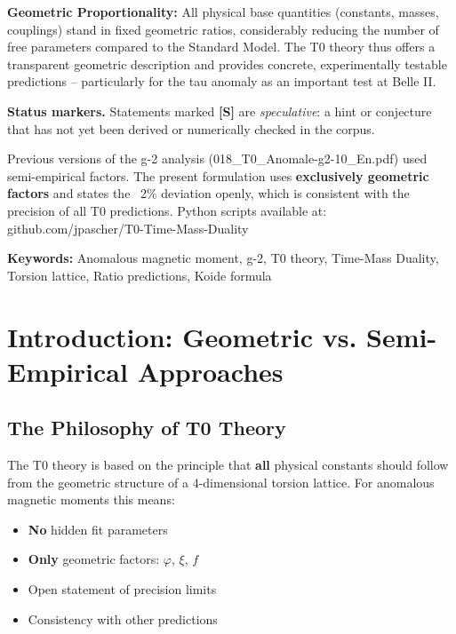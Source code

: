 		\textbf{Geometric Proportionality:} All physical base quantities (constants, masses, couplings) stand in fixed geometric ratios, considerably reducing the number of free parameters compared to the Standard Model. The T0 theory thus offers a transparent geometric description and provides concrete, experimentally testable predictions – particularly for the tau anomaly as an important test at Belle II.

	\medskip\noindent\textbf{Status markers.} Statements marked \textbf{[S]} are \emph{speculative}: a hint or conjecture that has not yet been derived or numerically checked in the corpus.


	
	\begin{tcolorbox}[colback=yellow!10!white, colframe=orange!75!black, title=Note on Older Documents]
		Previous versions of the g-2 analysis (018\_T0\_Anomale-g2-10\_En.pdf) used semi-empirical factors. The present formulation uses \textbf{exclusively geometric factors} and states the ~2\% deviation openly, which is consistent with the precision of all T0 predictions. Python scripts available at: github.com/jpascher/T0-Time-Mass-Duality
	\end{tcolorbox}
	
	\textbf{Keywords:} Anomalous magnetic moment, g-2, T0 theory, Time-Mass Duality, Torsion lattice, Ratio predictions, Koide formula
	
	
	\section{Introduction: Geometric vs. Semi-Empirical Approaches}
	
	\subsection{The Philosophy of T0 Theory}
	
	The T0 theory is based on the principle that \textbf{all} physical constants should follow from the geometric structure of a 4-dimensional torsion lattice. For anomalous magnetic moments this means:
	
	\begin{itemize}
		\item \textbf{No} hidden fit parameters
		\item \textbf{Only} geometric factors: $\varphi$, $\xi$, $f$
		\item Open statement of precision limits
		\item Consistency with other predictions
	\end{itemize}
	

